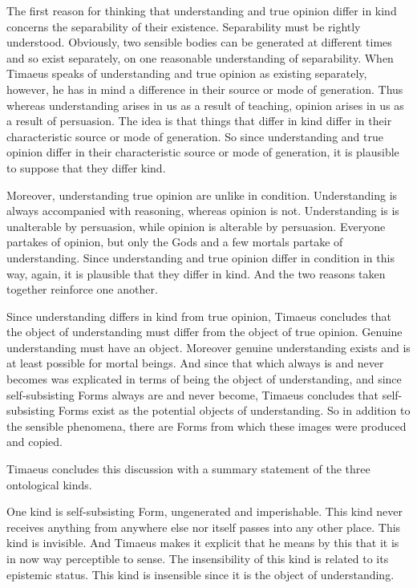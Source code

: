 The first reason for thinking that understanding and true opinion differ in kind concerns the separability of their existence. Separability must be rightly understood. Obviously, two sensible bodies can be generated at different times and so exist separately, on one reasonable understanding of separability. When Timaeus speaks of understanding and true opinion as existing separately, however, he has in mind a difference in their source or mode of generation. Thus whereas understanding arises in us as a result of teaching, opinion arises in us as a result of persuasion. The idea is that things that differ in kind differ in their characteristic source or mode of generation. So since understanding and true opinion differ in their characteristic source or mode of generation, it is plausible to suppose that they differ kind.

Moreover, understanding true opinion are unlike in condition. Understanding is always accompanied with reasoning, whereas opinion is not. Understanding is is unalterable by persuasion, while opinion is alterable by persuasion. Everyone partakes of opinion, but only the Gods and a few mortals partake of understanding. Since understanding and true opinion differ in condition in this way, again, it is plausible that they differ in kind. And the two reasons taken together reinforce one another.

Since understanding differs in kind from true opinion, Timaeus concludes that the object of understanding must differ from the object of true opinion. Genuine understanding must have an object. Moreover genuine understanding exists and is at least possible for mortal beings. And since that which always is and never becomes was explicated in terms of being the object of understanding, and since self-subsisting Forms always are and never become, Timaeus concludes that self-subsisting Forms exist as the potential objects of understanding. So in addition to the sensible phenomena, there are Forms from which these images were produced and copied.

Timaeus concludes this discussion with a summary statement of the three ontological kinds. 

One kind is self-subsisting Form, ungenerated and imperishable. This kind never receives anything from anywhere else nor itself passes into any other place. This kind is invisible. And Timaeus makes it explicit that he means by this that it is in now way perceptible to sense. The insensibility of this kind is related to its epistemic status. This kind is insensible since it is the object of understanding.

